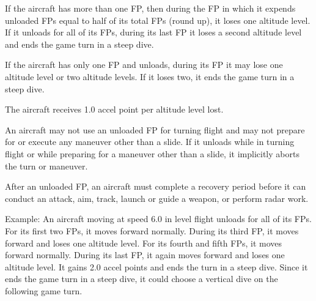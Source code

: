 {{{    If the aircraft has more than one FP, then during the FP in which it expends unloaded FPs equal to half of its total FPs (round up), it loses one altitude level. If it unloads for all of its FPs, during its last FP it loses a second altitude level and ends the game turn in a steep dive.

    If the aircraft has only one FP and unloads, during its FP it may lose one altitude level or two altitude levels. If it loses two, it ends the game turn in a steep dive.

}

The aircraft receives 1.0 accel point per altitude level lost.

An aircraft may not use an unloaded FP for turning flight and may not prepare for or execute any maneuver other than a slide.
If it unloads while in turning flight or while preparing for a maneuver other than a slide, it implicitly aborts the turn or maneuver.

After an unloaded FP, an aircraft must complete a recovery period before it can conduct an attack, aim, track, launch or guide a weapon, or perform radar work.


Example: An aircraft moving at speed 6.0 in level flight unloads for all of its FPs.
For its first two FPs, it moves forward normally.
During its third FP, it moves forward and loses one altitude level.
For its fourth and fifth FPs, it moves forward normally.
During its last FP, it again moves forward and loses one altitude level.
It gains 2.0 accel points and ends the turn in a steep dive.
Since it ends the game turn in a steep dive, it could choose a vertical dive on the following game turn.

}

}


